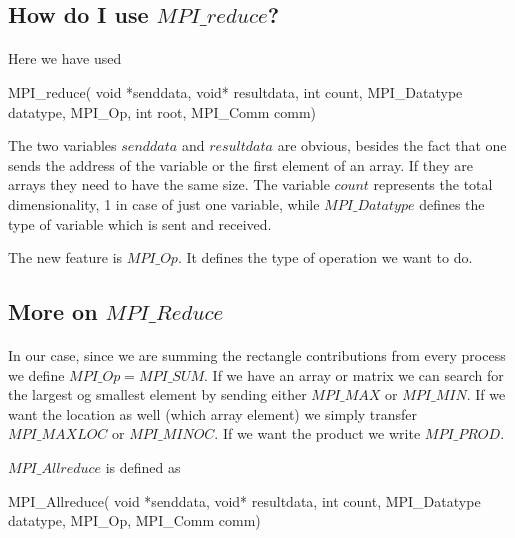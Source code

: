 \documentclass[%
oneside,                 %
final,                   %
10pt]{article}
\begin{document}
\ecppcod



\subsection{How do I use $MPI\_reduce$?}

\paragraph{}

Here we have used



\bcppcod
MPI_reduce( void *senddata, void* resultdata, int count, 
     MPI_Datatype datatype, MPI_Op, int root, MPI_Comm comm)

\ecppcod


The two variables $senddata$ and $resultdata$ are obvious, besides the fact that one sends the address
of the variable or the first element of an array.  If they are arrays they need to have the same size. 
The variable $count$ represents the total dimensionality, 1 in case of just one variable, 
while $MPI\_Datatype$ 
defines the type of variable which is sent and received.  

The new feature is $MPI\_Op$. It defines the type
of operation we want to do.



\subsection{More on $MPI\_Reduce$}

\paragraph{}
In our case, since we are summing
the rectangle  contributions from every process we define  $MPI\_Op = MPI\_SUM$.
If we have an array or matrix we can search for the largest og smallest element by sending either $MPI\_MAX$ or 
$MPI\_MIN$.  If we want the location as well (which array element) we simply transfer 
$MPI\_MAXLOC$ or $MPI\_MINOC$. If we want the product we write $MPI\_PROD$. 

$MPI\_Allreduce$ is defined as



\bcppcod
MPI_Allreduce( void *senddata, void* resultdata, int count, 
          MPI_Datatype datatype, MPI_Op, MPI_Comm comm)        
\end{document}

